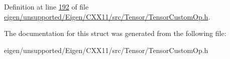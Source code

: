 Definition at line \hyperlink{eigen_2unsupported_2_eigen_2_c_x_x11_2src_2_tensor_2_tensor_custom_op_8h_source_l00192}{192} of file \hyperlink{eigen_2unsupported_2_eigen_2_c_x_x11_2src_2_tensor_2_tensor_custom_op_8h_source}{eigen/unsupported/\+Eigen/\+C\+X\+X11/src/\+Tensor/\+Tensor\+Custom\+Op.\+h}.



The documentation for this struct was generated from the following file\+:\begin{DoxyCompactItemize}
\item 
eigen/unsupported/\+Eigen/\+C\+X\+X11/src/\+Tensor/\+Tensor\+Custom\+Op.\+h\end{DoxyCompactItemize}
